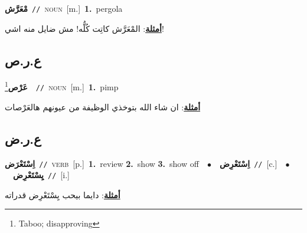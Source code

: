 \documentclass[10pt,a4paper,twoside]{article} %
\begin{document}
\begin{multicols}{2}
{\setlength\topsep{0pt}\textbf{\foreignlanguage{arabic}{مْعَرَّش}}\ {\color{gray}\texttt{//}\color{black}}\ \textsc{noun}\ [m.]\ \textbf{1.}~pergola\  \begin{flushright}\color{gray}\foreignlanguage{arabic}{\textbf{\underline{\foreignlanguage{arabic}{أمثلة}}}: المْعَرَّش كاتِت كُلُّه! مش ضايل منه اشي!}\end{flushright}\color{black}} \vspace{2mm}

\vspace{-3mm}
\subsection*{\color{blue}\foreignlanguage{arabic}{ع.ر.ص}\color{blue}{}} 

{\setlength\topsep{0pt}\textbf{\foreignlanguage{arabic}{عَرْص}}\footnote{Taboo; disapproving}\ \ {\color{gray}\texttt{//}\color{black}}\ \textsc{noun}\ [m.]\ \textbf{1.}~pimp\  \begin{flushright}\color{gray}\foreignlanguage{arabic}{\textbf{\underline{\foreignlanguage{arabic}{أمثلة}}}: ان شاء الله بتوخذي الوظيفة من عيونهم هالعَرْصات}\end{flushright}\color{black}} \vspace{2mm}

\vspace{-3mm}
\subsection*{\color{blue}\foreignlanguage{arabic}{ع.ر.ض}\color{blue}{}} 

{\setlength\topsep{0pt}\textbf{\foreignlanguage{arabic}{اِسْتَعْرَض}}\ {\color{gray}\texttt{//}\color{black}}\ \textsc{verb}\ [p.]\ \textbf{1.}~review  \textbf{2.}~show  \textbf{3.}~show off\ \ $\bullet$\ \ \setlength\topsep{0pt}\textbf{\foreignlanguage{arabic}{اِسْتَعْرِض}}\ {\color{gray}\texttt{//}\color{black}}\ [c.]\ \ $\bullet$\ \ \setlength\topsep{0pt}\textbf{\foreignlanguage{arabic}{يِسْتَعْرِض}}\ {\color{gray}\texttt{//}\color{black}}\ [i.]\  \begin{flushright}\color{gray}\foreignlanguage{arabic}{\textbf{\underline{\foreignlanguage{arabic}{أمثلة}}}: دايما بيحب يِسْتَعْرِض قدراته}\end{flushright}\color{black}} \vspace{2mm}


\end{multicols}
\end{document}
